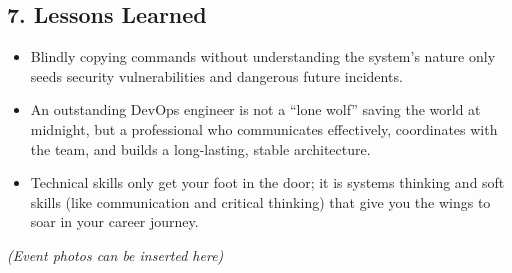 \hypertarget{lessons-learned}{%
\subsection{7. Lessons Learned}}

\begin{itemize}
\tightlist
\item
  Blindly copying commands without understanding the system's nature
  only seeds security vulnerabilities and dangerous future incidents.
\item
  An outstanding DevOps engineer is not a ``lone wolf'' saving the world
  at midnight, but a professional who communicates effectively,
  coordinates with the team, and builds a long-lasting, stable
  architecture.
\item
  Technical skills only get your foot in the door; it is systems
  thinking and soft skills (like communication and critical thinking)
  that give you the wings to soar in your career journey.
\end{itemize}

\emph{(Event photos can be inserted here)}

